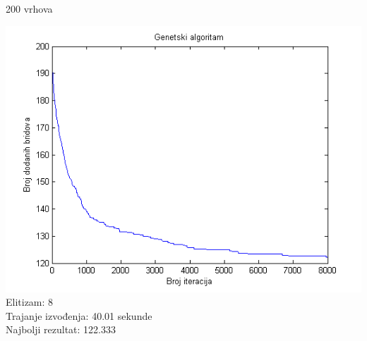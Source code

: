 \documentclass{beamer}
\begin{document}
\begin{frame}{200 vrhova}
\begin{center}
\includegraphics[scale = 0.55]{par8.png}\\
\tiny
Elitizam: 8\\
Trajanje izvođenja: 40.01 sekunde\\
Najbolji rezultat: 122.333\\
\end{center}
\end{frame}

\end{document}
